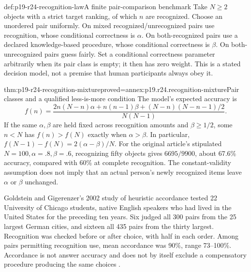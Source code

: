 \begin{hbdefinition}{def:p19-r24-recognition-law}{A finite pair-comparison benchmark}
Take \(N\geq2\) objects with a strict target ranking, of which
\(n\) are recognized. Choose an unordered pair uniformly. On mixed
recognized/unrecognized pairs use recognition, whose conditional
correctness is \(\alpha\). On both-recognized pairs use a declared
knowledge-based procedure, whose conditional correctness is
\(\beta\). On both-unrecognized pairs guess fairly. Set a conditional
correctness parameter arbitrarily when its pair class is empty; it then
has zero weight. This is a stated decision model, not a premise that
human participants always obey it.
\end{hbdefinition}

\begin{hbtheorem}{thm:p19-r24-recognition-mixture}{proved=annex:p19.r24.recognition-mixture}{Pair classes and a qualified less-is-more condition}
The model's expected accuracy is
\[
 f(n)=\frac{2n(N-n)\alpha+n(n-1)\beta
                 +(N-n)(N-n-1)/2}{N(N-1)}.
\]
If the same \(\alpha,\beta\) are held fixed across recognition
amounts and \(\beta\geq1/2\), some \(n<N\) has
\(f(n)>f(N)\) exactly when \(\alpha>\beta\). In particular,
\(f(N-1)-f(N)=2(\alpha-\beta)/N\). For the original article's
stipulated \(N=100,\alpha=.8,\beta=.6\), recognizing fifty
objects gives \(6695/9900\), about 67.6\% accuracy, compared
with 60\% at complete recognition. The constant-validity assumption
does not imply that an actual person's newly recognized items leave
\(\alpha\) or \(\beta\) unchanged.
\end{hbtheorem}

Goldstein and Gigerenzer's 2002 study of heuristic accordance tested
22 University of Chicago students, native English speakers who had
lived in the United States for the preceding ten years. Six judged
all 300 pairs from the 25 largest German cities, and sixteen all
435 pairs from the thirty largest. Recognition was checked before
or after choice, with half in each order. Among pairs permitting
recognition use, mean accordance was 90\%, range 73--100\%.
Accordance is not answer accuracy and does not by itself exclude a
compensatory procedure producing the same choices
\cite[p.~81]{GoldsteinGigerenzer2002Recognition}.

